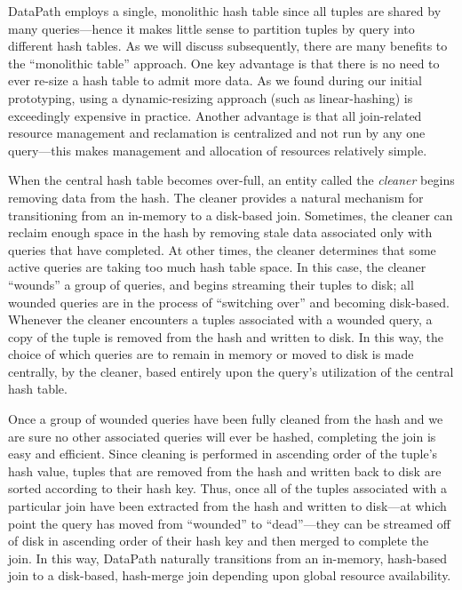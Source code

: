 \documentclass{sig-alternate}
\renewcommand\:{\colon} %
\begin{document}
DataPath employs a single, monolithic hash table since
all tuples are shared by many queries---hence it makes little sense to partition tuples by query into different hash tables.
As we will discuss subsequently, there are many benefits to the ``monolithic table'' approach.
One key advantage is that there is no need to ever re-size a hash table to admit more data.  As we found during our
initial prototyping, using a dynamic-resizing approach (such as linear-hashing)
is exceedingly expensive in practice.  
Another advantage is that all join-related resource management and reclamation is centralized and
not run by any one query---this makes management and allocation of resources relatively simple.

When the central hash table becomes over-full, an entity called the \emph{cleaner} begins removing data 
from the hash.
The cleaner provides a natural mechanism for transitioning from an in-memory to a disk-based join.
Sometimes, the cleaner can reclaim enough space in the hash by removing stale data associated only with
queries that have completed. 
At other times, the cleaner determines that some active queries
are taking too much hash table space.  In this case, the cleaner ``wounds'' a group of queries, and begins streaming 
their tuples to disk; all wounded queries are in the process of
``switching over'' and becoming disk-based.  
Whenever the cleaner encounters a tuples associated with a wounded query, a copy of the tuple is removed from the
hash and written to disk.  
In this way, the choice of which 
queries are to remain in memory or moved to disk is made centrally, by the cleaner, based entirely upon the query's 
utilization of the central hash table.

Once a group of wounded queries have been fully cleaned from the hash and we are sure no other associated queries will
ever be hashed, completing the join is easy and efficient.
Since cleaning is performed in ascending order of the tuple's hash value, tuples that are removed from 
the hash and 
written back to disk are sorted according to their hash key.  Thus, once all of the tuples associated with a particular
join have been extracted from the hash and written to disk---at which point the query has moved from ``wounded'' to ``dead''---they
can be streamed off of disk
in ascending order of their hash key and then merged to complete the join.
In this way, DataPath naturally transitions from an in-memory, hash-based join to a disk-based, hash-merge join depending upon 
global resource availability. 
\end{document}
